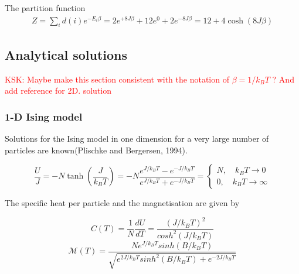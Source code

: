 \documentclass[11pt,a4paper,english]{article}
\numberwithin{equation}{section}
\newcommand{\magM}{\mathcal{M}}
\begin{document}
The partition function
\begin{gather}
Z = \sum_i d(i) e^{-E_i\beta} = 2e^{+8J\beta}+12e^{0}+2e^{-8J\beta}
 = 12 + 4\cosh(8J\beta)
\end{gather}




\subsection{Analytical solutions}

\textcolor{red}{KSK: Maybe make this section consistent with the notation of $\beta = 1/ k_B T$ ? And add reference for 2D. solution}

\subsubsection{1-D Ising model}
Solutions for the Ising model in one dimension for a very large number of particles are known(Plischke and Bergersen, 1994). 

\begin{equation}
\frac{U}{J} = -N \tanh \left( \frac{J}{k_B T} \right) = -N \frac{e^{J/k_B T}-e^{-J/k_B T} }{e^{J/k_B T}+ e^{-J/k_B T} } =  \begin{cases} N, \quad k_B T \to 0 \\ 0, \quad  k_B T \to \infty \end{cases}
\end{equation}

The specific heat per particle and the magnetisation are given by 

\begin{equation}
C(T) = \frac{1}{N} \frac{dU}{dT} = \frac{(J/k_B T)^2}{cosh^2 (J/k_B T)}
\end{equation}
\begin{equation}
\magM(T) = \frac{N e^{J / k_B T} sinh(B/k_B T) }{ \sqrt{ e^{2J/k_B T} sinh^2 (B/k_B T) + e^{-2J/ k_B T}  } }
\end{equation}
\end{document}
